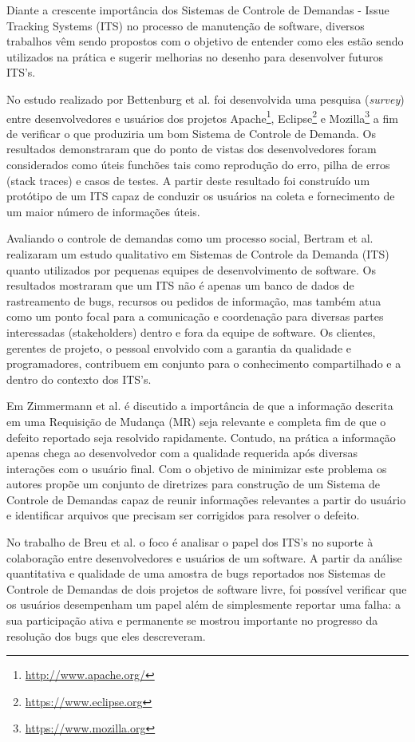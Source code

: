 \documentclass[msc,proposal,hidelot,hideabstract]{ppgccufmg} %
\begin{document}
Diante a crescente importância dos Sistemas de Controle de Demandas -
Issue Tracking Systems (ITS) no processo de manutenção de software, diversos
trabalhos vêm sendo propostos com o objetivo de entender como eles estão sendo
utilizados na prática e sugerir melhorias no desenho para desenvolver futuros
ITS's.


No estudo realizado por Bettenburg et al. \cite{bettenburg2008makes} foi
desenvolvida uma pesquisa (\textit{survey}) entre desenvolvedores e usuários dos
projetos Apache\footnote{\url{http://www.apache.org/}},
Eclipse\footnote{\url{https://www.eclipse.org}} e
Mozilla\footnote{\url{https://www.mozilla.org}} a fim de verificar o que
produziria um bom Sistema de Controle de Demanda. Os resultados demonstraram
que do ponto de vistas dos desenvolvedores foram considerados como úteis
funchões tais como reprodução do erro, pilha de erros (stack traces) e casos de
testes. A partir deste resultado foi construído um protótipo de um ITS
capaz de conduzir os usuários na coleta e fornecimento de um maior número de
informações úteis.

Avaliando o controle de demandas como um processo social, Bertram et
al. \cite{Bertram:2010:CCB:1718918.1718972} realizaram um estudo qualitativo em
Sistemas de Controle da Demanda (ITS) quanto utilizados por pequenas equipes de
desenvolvimento de software. Os resultados mostraram que um ITS não é apenas um
banco de dados de rastreamento de bugs, recursos ou  pedidos de informação, mas
também atua como um ponto focal para a comunicação e coordenação para diversas
partes interessadas (stakeholders) dentro e fora da equipe de software. Os
clientes, gerentes de projeto, o pessoal envolvido com a garantia da qualidade
e programadores, contribuem em conjunto para o conhecimento compartilhado
e a dentro do contexto dos ITS's.


Em Zimmermann et al. \cite{5070993} é discutido a importância de que a
informação descrita em uma Requisição de Mudança (MR) seja relevante e completa
fim de que o defeito reportado seja resolvido rapidamente. Contudo, na prática
a informação apenas chega ao desenvolvedor com a qualidade requerida após
diversas interações com o usuário final. Com o objetivo de minimizar este
problema os autores propõe um conjunto de diretrizes para construção de um
Sistema de Controle de Demandas capaz de reunir informações relevantes a partir do usuário e identificar arquivos que precisam
ser corrigidos para resolver o defeito.

No trabalho de Breu et al.\cite{Breu:2010:INB:1718918.1718973} o foco é
analisar o papel dos ITS's no suporte à colaboração entre desenvolvedores e
usuários de um software. A partir da análise quantitativa e qualidade de uma
amostra de bugs reportados nos Sistemas de Controle de Demandas de dois
projetos de software livre, foi possível verificar que os usuários desempenham
um papel além de simplesmente reportar uma falha: a sua participação ativa e
permanente se mostrou importante no progresso da resolução dos bugs que eles
descreveram.
\end{document}
